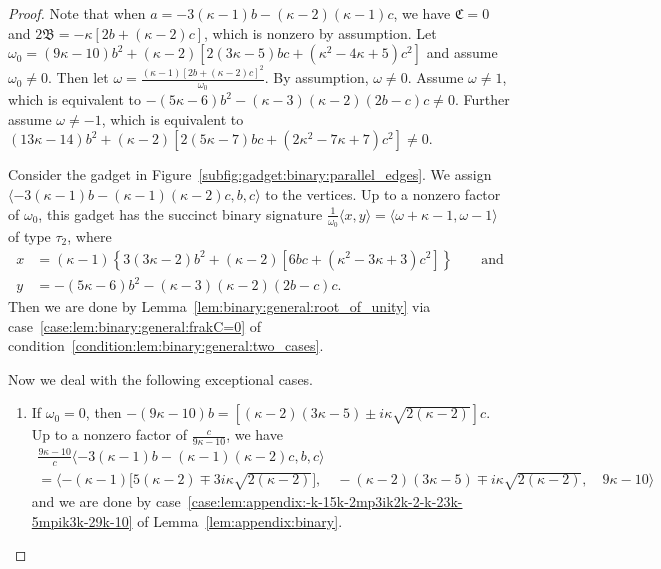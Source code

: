 \documentclass[11pt]{article}
\begin{document}
\begin{proof}
 Note that when $a = -3 (\kappa - 1) b - (\kappa - 2) (\kappa - 1) c$,
 we have $\mathfrak{C} = 0$
 and $2 \mathfrak{B} = -\kappa [2 b + (\kappa - 2) c]$,
 which is nonzero by assumption.
 Let $\omega_0 = (9 \kappa - 10) b^2 + (\kappa - 2) [2 (3 \kappa - 5) b c + (\kappa^2 - 4 \kappa + 5) c^2]$
 and assume $\omega_0 \ne 0$.
 Then let $\omega = \frac{(\kappa - 1) [2 b + (\kappa - 2) c]^2}{\omega_0}$.
 By assumption, $\omega \ne 0$.
 Assume $\omega \ne 1$,
 which is equivalent to $-(5 \kappa - 6) b^2 - (\kappa - 3) (\kappa - 2) (2 b - c) c \ne 0$.
 Further assume $\omega \ne -1$,
 which is equivalent to $(13 \kappa - 14) b^2 + (\kappa - 2) [2 (5 \kappa - 7) b c + (2 \kappa^2 - 7 \kappa + 7) c^2] \ne 0$.
 
 Consider the gadget in Figure~\ref{subfig:gadget:binary:parallel_edges}.
 We assign $\langle -3 (\kappa - 1) b - (\kappa - 1) (\kappa - 2) c, b, c \rangle$ to the vertices.
 Up to a nonzero factor of $\omega_0$,
 this gadget has the succinct binary signature $\frac{1}{\omega_0} \langle x,y \rangle = \langle \omega + \kappa - 1, \omega - 1 \rangle$ of type $\tau_2$,
 where
 \begin{align*}
  x &= (\kappa - 1) \left\{3 (3 \kappa - 2) b^2 + (\kappa - 2) \left[6 b c + (\kappa^2 - 3 \kappa + 3) c^2\right]\right\}
  \qquad \text{and}\\
  y &= -(5 \kappa - 6) b^2 - (\kappa - 3) (\kappa - 2) (2 b - c) c.
 \end{align*}
 Then we are done by Lemma~\ref{lem:binary:general:root_of_unity}
 via case~\ref{case:lem:binary:general:frakC=0} of condition~\ref{condition:lem:binary:general:two_cases}.
 
 Now we deal with the following exceptional cases.
 \begin{enumerate}
  \item If $\omega_0 = 0$,
  then $-(9 \kappa - 10) b = [(\kappa - 2) (3 \kappa - 5) \pm i \kappa \sqrt{2 (\kappa - 2)}] c$.
  Up to a nonzero factor of $\frac{c}{9 \kappa - 10}$,
  we have
  \begin{multline*}
   \frac{9 \kappa - 10}{c}
   \langle -3 (\kappa - 1) b - (\kappa - 1) (\kappa - 2) c, b, c \rangle\\
   =
   \langle
    -(\kappa - 1) \big[5 (\kappa - 2) \mp 3 i \kappa \sqrt{2 (\kappa - 2)}\big],
    \quad
    -(\kappa - 2) (3 \kappa - 5) \mp i \kappa \sqrt{2 (\kappa - 2)},
    \quad
    9 \kappa - 10
   \rangle
  \end{multline*}
  and we are done by case~\ref{case:lem:appendix:-k-15k-2mp3ik2k-2-k-23k-5mpik3k-29k-10} of Lemma~\ref{lem:appendix:binary}.
  

\end{enumerate}
\end{proof}
\end{document}

